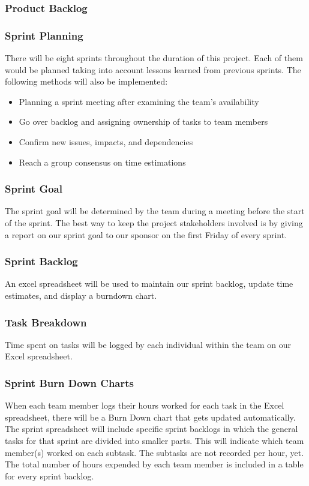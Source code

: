 \subsubsection{Product Backlog}

\subsubsection{Sprint Planning}
There will be eight sprints throughout the duration of this project. Each of them would be planned taking into account lessons learned from previous sprints. The following methods will also be implemented:
\begin{itemize}
  \item Planning a sprint meeting after examining the team's availability
  \item Go over backlog and assigning ownership of tasks to team members
  \item Confirm new issues, impacts, and dependencies
  \item Reach a group consensus on time estimations
\end{itemize}

\subsubsection{Sprint Goal}
The sprint goal will be determined by the team during a meeting before the start of the sprint. The best way to keep the project stakeholders involved is by giving a report on our sprint goal to our sponsor on the first Friday of every sprint.

\subsubsection{Sprint Backlog}
{An excel spreadsheet will be used to maintain our sprint backlog, update time estimates, and display a burndown chart.}

\subsubsection{Task Breakdown}
Time spent on tasks will be logged by each individual within the team on our Excel spreadsheet.

\subsubsection{Sprint Burn Down Charts}
When each team member logs their hours worked for each task in the Excel spreadsheet, there will be a Burn Down chart that gets updated automatically. The sprint spreadsheet will include specific sprint backlogs in which the general tasks for that sprint are divided into smaller parts. This will indicate which team member(s) worked on each subtask. The subtasks are not recorded per hour, yet. The total number of hours expended by each team member is included in a table for every sprint backlog.


